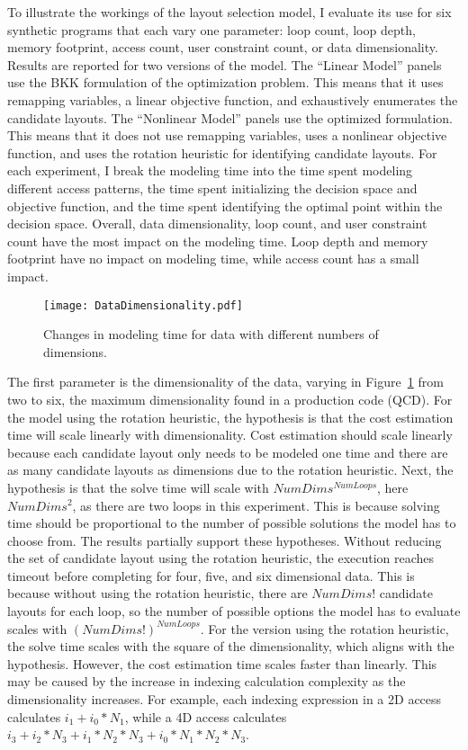 To illustrate the workings of the layout selection model, I evaluate its use for six synthetic programs that each vary one parameter: loop count, loop depth, memory footprint, access count, user constraint count, or data dimensionality.
Results are reported for two versions of the model.
The ``Linear Model'' panels use the BKK formulation of the optimization problem.
This means that it uses remapping variables, a linear objective function, and exhaustively enumerates the candidate layouts.
The ``Nonlinear Model'' panels use the optimized \FormatDecisions{} formulation.
This means that it does not use remapping variables, uses a nonlinear objective function, and uses the rotation heuristic for identifying candidate layouts.
For each experiment, I break the modeling time into the time spent modeling different access patterns, the time spent initializing the decision space and objective function, and the time spent identifying the optimal point within the decision space. 
Overall, data dimensionality, loop count, and user constraint count have the most impact on the modeling time.
Loop depth and memory footprint have no impact on modeling time, while access count has a small impact.

\begin{figure}
	\centering
	\texttt{[image: DataDimensionality.pdf]}
	\caption{Changes in modeling time for data with different numbers of dimensions.}\label{DataDimensionality}
\end{figure}
The first parameter is the dimensionality of the data, varying in Figure~\ref{DataDimensionality} from two to six, the maximum dimensionality found in a production code (QCD).
For the model using the rotation heuristic, the hypothesis is that the cost estimation time will scale linearly with dimensionality.
Cost estimation should scale linearly because each candidate layout only needs to be modeled one time and there are as many candidate layouts as dimensions due to the rotation heuristic.
Next, the hypothesis is that the solve time will scale with $NumDims^{NumLoops}$, here $NumDims^2$, as there are two loops in this experiment.
This is because solving time should be proportional to the number of possible solutions the model has to choose from.
The results partially support these hypotheses.
Without reducing the set of candidate layout using the rotation heuristic, the execution reaches timeout before completing for four, five, and six dimensional data. 
This is because without using the rotation heuristic, there are $NumDims!$ candidate layouts for each loop, so the number of possible options the model has to evaluate scales with $(NumDims!)^{NumLoops}$.
For the version using the rotation heuristic, the solve time scales with the square of the dimensionality, which aligns with the hypothesis.
However, the cost estimation time scales faster than linearly. 
This may be caused by the increase in indexing calculation complexity as the dimensionality increases.
For example, each indexing expression in a 2D access calculates $i_1 + i_0 * N_1$, while a 4D access calculates $i_3 + i_2 * N_3 + i_1 * N_2 * N_3 + i_0 * N_1 * N_2 * N_3$.

